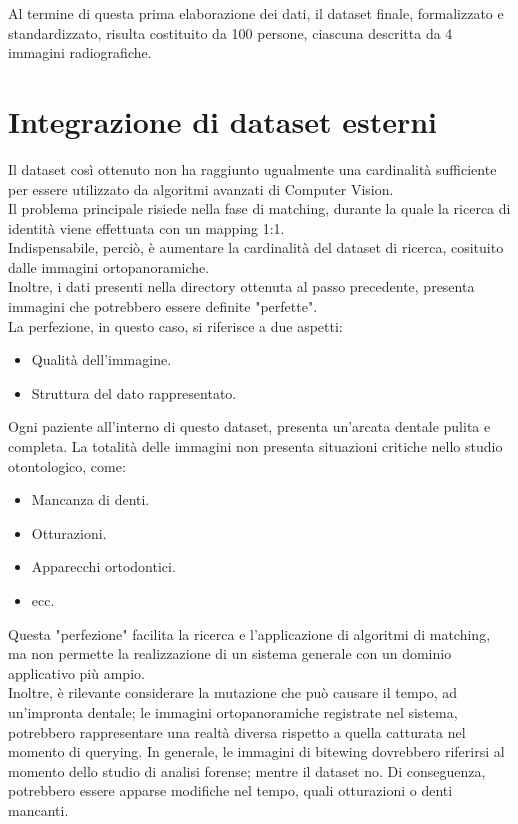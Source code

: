 \documentclass[12pt,a4paper,openright,twoside]{book}
\begin{document}
Al termine di questa prima elaborazione dei dati, il dataset finale, formalizzato e standardizzato, risulta costituito da 100 persone, ciascuna descritta da 4 immagini radiografiche.


\section{Integrazione di dataset esterni}
Il dataset così ottenuto non ha raggiunto ugualmente una cardinalità sufficiente per essere utilizzato da algoritmi avanzati di Computer Vision. \\
Il problema principale risiede nella fase di matching, durante la quale la ricerca di identità viene effettuata con un mapping 1:1.\\
Indispensabile, perciò, è aumentare la cardinalità del dataset di ricerca, cosituito dalle immagini ortopanoramiche.\\
Inoltre, i dati presenti nella directory ottenuta al passo precedente, presenta immagini che potrebbero essere definite "perfette".\\
La perfezione, in questo caso, si riferisce a due aspetti:
\begin{itemize}
\item Qualità dell'immagine.
\item Struttura del dato rappresentato.
\end{itemize}

Ogni paziente all'interno di questo dataset, presenta un'arcata dentale pulita e completa. La totalità delle immagini non presenta situazioni critiche nello studio otontologico, come:
\begin{itemize}
\item Mancanza di denti.
\item Otturazioni.
\item Apparecchi ortodontici.
\item ecc.
\end{itemize}

Questa "perfezione" facilita la ricerca e l'applicazione di algoritmi di matching, ma non permette la realizzazione di un sistema generale con un dominio applicativo più ampio. \\
Inoltre, è rilevante considerare la mutazione che può causare il tempo, ad un'impronta dentale; le immagini ortopanoramiche registrate nel sistema, potrebbero rappresentare una realtà diversa rispetto a quella catturata nel momento di querying. In generale, le immagini di bitewing dovrebbero riferirsi al momento dello studio di analisi forense; mentre il dataset no. Di conseguenza, potrebbero essere apparse modifiche nel tempo, quali otturazioni o denti mancanti.\\
\end{document}
